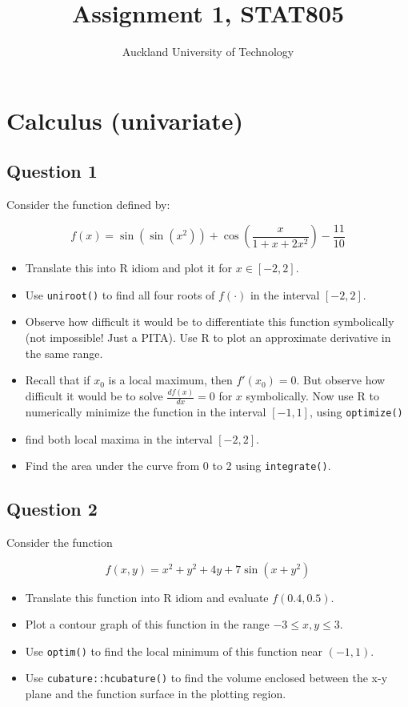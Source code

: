 \documentclass[nojss]{jss}\usepackage[]{graphicx}\usepackage[]{color}
\author{Auckland University of Technology}
\title{Assignment 1, STAT805}
\begin{document}
  
\section{Calculus (univariate)}


\subsection*{Question 1}

Consider the  function defined by:

\[
f(x) = \sin(\sin(x^2)) + \cos\left(\frac{x}{1+x+2x^2}\right)-\frac{11}{10}
\]


\begin{itemize}
\item Translate this into R idiom and plot it for
  $x\in\left[-2,2\right]$.
  \item Use {\tt uniroot()} to find all four roots of $f(\cdot)$ in
    the interval $\left[-2,2\right]$.
\item Observe how difficult it would be to differentiate this function
  symbolically (not impossible!  Just a PITA).  Use R to plot an
  approximate derivative in the same range.
\item Recall that if $x_0$ is a local maximum, then
  $f'(x_0)=0$.  But observe how difficult it would be to solve
  $\frac{df(x)}{dx}=0$ for $x$ symbolically.  Now use R to numerically minimize the
  function in the interval $\left[-1,1\right]$, using {\tt optimize()}
  \item find both local maxima in the interval $\left[-2,2\right]$.
\item Find the area under the curve from 0 to 2 using {\tt integrate()}. 
\end{itemize}

\subsection*{Question 2}

Consider the function

\[  
f(x,y) = x^2+y^2+4y+ 7\sin(x+y^2)
\]

\begin{itemize}
\item Translate this function into R idiom and evaluate $f(0.4,0.5)$.
\item Plot a contour graph of this function in the range $-3\leq x,y\leq 3$.
\item Use {\tt optim()} to find the local minimum of this function near
$(-1,1)$.
\item Use {\tt cubature::hcubature()} to find the volume enclosed
between the x-y plane and the function surface in the plotting region.
\end{itemize}
    
\end{document}
